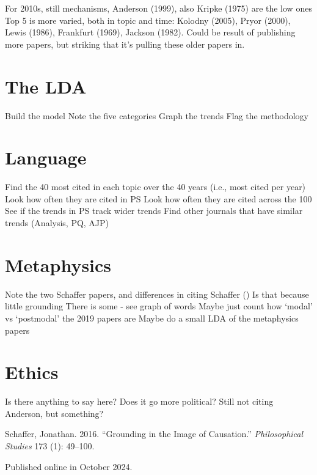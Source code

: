 \documentclass[
  10pt,
  letterpaper,
  DIV=11,
  numbers=noendperiod,
  twoside]{scrartcl}
\newlength{\cslhangindent}
\newenvironment{CSLReferences}[2] %
 {\begin{list}{}{%
  \setlength{\itemindent}{0pt}
  \setlength{\leftmargin}{0pt}
  \setlength{\parsep}{0pt}
  \ifodd #1
   \setlength{\leftmargin}{\cslhangindent}
   \setlength{\itemindent}{-1\cslhangindent}
  \fi
  \setlength{\itemsep}{#2\baselineskip}}}
 {\end{list}}
\begin{document}
For 2010s, still mechanisms, Anderson (1999), also Kripke (1975) are the
low ones Top 5 is more varied, both in topic and time: Kolodny (2005),
Pryor (2000), Lewis (1986), Frankfurt (1969), Jackson (1982). Could be
result of publishing more papers, but striking that it's pulling these
older papers in.

\section{The LDA}\label{the-lda}

Build the model Note the five categories Graph the trends Flag the
methodology

\section{Language}\label{language}

Find the 40 most cited in each topic over the 40 years (i.e., most cited
per year) Look how often they are cited in PS Look how often they are
cited across the 100 See if the trends in PS track wider trends Find
other journals that have similar trends (Analysis, PQ, AJP)

\section{Metaphysics}\label{metaphysics}

Note the two Schaffer papers, and differences in citing Schaffer
() Is that because little
grounding There is some - see graph of words Maybe just count how
`modal' vs `postmodal' the 2019 papers are Maybe do a small LDA of the
metaphysics papers

\section{Ethics}\label{ethics}

Is there anything to say here? Does it go more political? Still not
citing Anderson, but something?

\label{refs}
\begin{CSLReferences}{1}{0}
Schaffer, Jonathan. 2016. {``Grounding in the Image of Causation.''}
\emph{Philosophical Studies} 173 (1): 49--100.

\end{CSLReferences}



\noindent Published online in October 2024.
\end{document}
